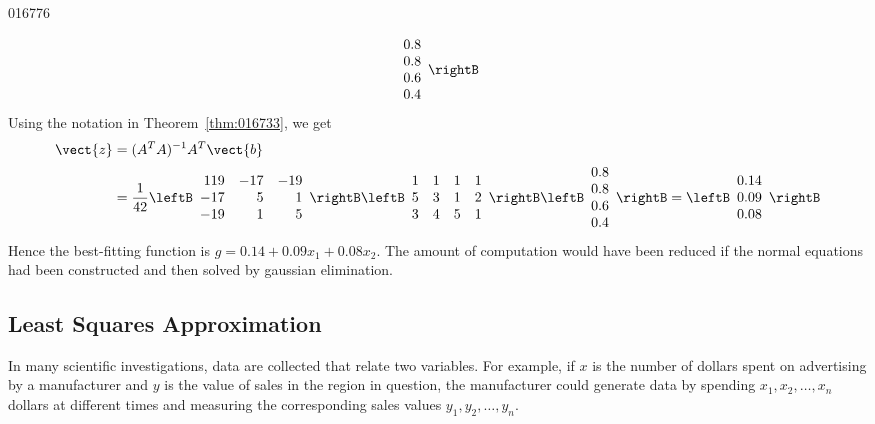\begin{example}{}{016776}
\begin{solution}
\begin{equation*}
\begin{array}{r}
0.8 \\
0.8 \\
0.6 \\
0.4
\end{array} \rightB
\end{equation*}
Using the notation in Theorem~\ref{thm:016733}, we get
\begin{align*}
\vect{z} &= (A^TA)^{-1}A^T\vect{b} \\
&= \frac{1}{42}
\leftB \begin{array}{rrr}
119 & -17 & -19 \\
-17 &  5  &   1 \\
-19 &  1  &   5
\end{array} \rightB
\leftB \begin{array}{rrrr}
1 & 1 & 1 & 1 \\
5 & 3 & 1 & 2 \\
3 & 4 & 5 & 1 
\end{array} \rightB
\leftB \begin{array}{r}
0.8 \\
0.8 \\
0.6 \\
0.4
\end{array} \rightB
= \leftB \begin{array}{r}
0.14 \\
0.09 \\
0.08
\end{array} \rightB
\end{align*}
Hence the best-fitting function is $g = 0.14 + 0.09x_{1} + 0.08x_{2}$. The amount of computation would have been reduced if the normal equations had been constructed and then solved by gaussian elimination.
\end{solution}
\end{example}

\subsection*{Least Squares Approximation}

In many scientific investigations, data are collected that relate two variables. For example, if $x$ is the number of dollars spent on advertising by a manufacturer and $y$ is the value of sales in the region in question, the manufacturer could generate data by spending $x_{1}, x_{2}, \dots, x_{n}$ dollars at different times and measuring the corresponding sales values $y_{1}, y_{2}, \dots, y_{n}$.

